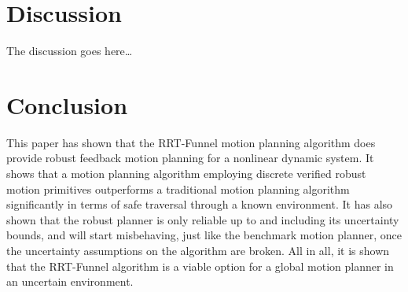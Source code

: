 \documentclass{IEEEtran}
\newcommand{\rrtfunnel}{RRT-Funnel}
\newcommand{\0}{\mathbf{0}}
\newcommand{\1}{\mathbf{1}}
\begin{document}
\section{Discussion}

The discussion goes here\ldots

\section{Conclusion}

This paper has shown that the \rrtfunnel{} motion planning algorithm does
provide robust feedback motion planning for a nonlinear dynamic system. It shows
that a motion planning algorithm employing discrete verified robust motion
primitives outperforms a traditional motion planning algorithm significantly in
terms of safe traversal through a known environment. It has also shown that the
robust planner is only reliable up to and including its uncertainty bounds, and
will start misbehaving, just like the benchmark motion planner, once the
uncertainty assumptions on the algorithm are broken. All in all, it is shown
that the \rrtfunnel{} algorithm is a viable option for a global motion planner
in an uncertain environment.




%
%
\end{document}
